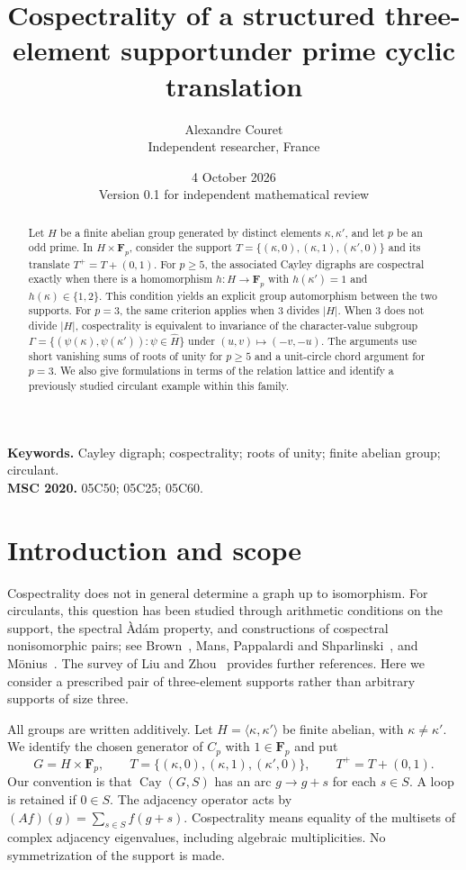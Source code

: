 \documentclass[11pt]{article}
\title{Cospectrality of a structured three-element support\newline under prime cyclic translation}
\author{Alexandre Couret\\Independent researcher, France}
\date{4 October 2026\\\small Version 0.1 for independent mathematical review}
\theoremstyle{remark}\newtheorem{remark}[theorem]{Remark}
\newcommand{\Fp}{\mathbf F_p}
\newcommand{\Cay}{\operatorname{Cay}}
\begin{document}
\maketitle
\begin{abstract}
Let $H$ be a finite abelian group generated by distinct elements $\kappa,\kappa'$, and let $p$ be an odd prime. In $H\times\mathbf F_p$, consider the support $T=\{(\kappa,0),(\kappa,1),(\kappa',0)\}$ and its translate $T^+=T+(0,1)$. For $p\geq5$, the associated Cayley digraphs are cospectral exactly when there is a homomorphism $h:H\to\mathbf F_p$ with $h(\kappa')=1$ and $h(\kappa)\in\{1,2\}$. This condition yields an explicit group automorphism between the two supports. For $p=3$, the same criterion applies when $3$ divides $|H|$. When $3$ does not divide $|H|$, cospectrality is equivalent to invariance of the character-value subgroup $\Gamma=\{(\psi(\kappa),\psi(\kappa')):\psi\in\widehat H\}$ under $(u,v)\mapsto(-v,-u)$. The arguments use short vanishing sums of roots of unity for $p\geq5$ and a unit-circle chord argument for $p=3$. We also give formulations in terms of the relation lattice and identify a previously studied circulant example within this family.
\end{abstract}
\noindent\textbf{Keywords.} Cayley digraph; cospectrality; roots of unity; finite abelian group; circulant.\\
\textbf{MSC 2020.} 05C50; 05C25; 05C60.

\section{Introduction and scope}
Cospectrality does not in general determine a graph up to isomorphism. For circulants, this question has been studied through arithmetic conditions on the support, the spectral \`Ad\'am property, and constructions of cospectral nonisomorphic pairs; see Brown~\cite{Brown}, Mans, Pappalardi and Shparlinski~\cite{MPS}, and M\"onius~\cite{Moenius2020,Moenius}. The survey of Liu and Zhou~\cite{LZ} provides further references. Here we consider a prescribed pair of three-element supports rather than arbitrary supports of size three.

All groups are written additively. Let $H=\langle\kappa,\kappa'\rangle$ be finite abelian, with $\kappa\ne\kappa'$. We identify the chosen generator of $C_p$ with $1\in\Fp$ and put
\begin{equation}\label{supports}
G=H\times\Fp,\qquad
T=\{(\kappa,0),(\kappa,1),(\kappa',0)\},\qquad T^+=T+(0,1).
\end{equation}
Our convention is that $\Cay(G,S)$ has an arc $g\to g+s$ for each $s\in S$. A loop is retained if $0\in S$. The adjacency operator acts by $(Af)(g)=\sum_{s\in S}f(g+s)$. Cospectrality means equality of the multisets of complex adjacency eigenvalues, including algebraic multiplicities. No symmetrization of the support is made.
\end{document}
